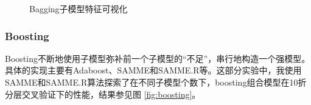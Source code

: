 \documentclass[12pt,a4paper]{article}
\theoremstyle{definition}
\begin{document}
\begin{figure}[H]
	\centering
	\caption{Bagging子模型特征可视化}
	\label{fig:bagging-feature}
\end{figure}

\vspace{-0.05\linewidth}
\subsubsection{Boosting}
\label{sec:boosting}

Boosting不断地使用子模型弥补前一个子模型的“不足”，串行地构造一个强模型。具体的实现主要有Adaboost、SAMME和SAMME.R等。这部分实验中，我使用SAMME和SAMME.R算法探索了在不同子模型个数下，boosting组合模型在10折分层交叉验证下的性能，结果参见图 \ref{fig:boosting}。
\end{document}
